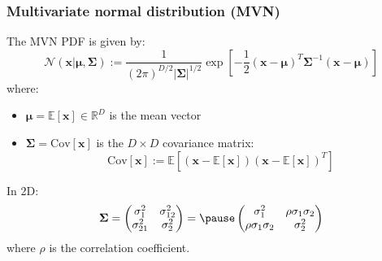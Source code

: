 \documentclass[usenames,dvipsnames,smaller]{beamer}
\newcommand{\lt}{\left}
\newcommand{\rt}{\right}
\newcommand{\?}{\stackrel{?}{=}}
\newcommand{\fr}{\frac}
\begin{document}
 \begin{frame}
   \frametitle{Multivariate normal distribution (MVN)}
   \pause
   The MVN PDF is given by:\pause
   \begin{equation}
     \mathscr{N}(\bm{x} | \bm{\mu}, \bm{\Sigma}) :=
     \fr{1}{(2\pi)^{D/2}|\bm{\Sigma}|^{1/2}} \exp \lt[ -\fr{1}{2} ({\bm x} - {\bm\mu})^T{\bm\Sigma}^{-1}({\bm x} - {\bm \mu})\rt]
     \end{equation}
     \pause
     where:
     \begin{itemize}
     \item $\bm\mu = \mathbb{E}[{\bm x}] \in \mathbb{R}^D$ is the mean vector \pause
     \item $\bm\Sigma = \mathrm{Cov}[{\bm x}]$ is the $D\times D$ covariance matrix: \pause
       \begin{equation}
         \mathrm{Cov}[{\bm x}] := \mathbb{E}\lt[ (\bm x - \mathbb{E}[{\bm x}])(\bm x - \mathbb{E}[{\bm x}])^T\rt]
       \end{equation}
     \end{itemize}
     \pause
     In 2D:
     \pause
     \begin{equation}
       \bm{\Sigma} =
       \begin{pmatrix}
         \sigma_1^2 & \sigma_{12}^2 \\ \sigma_{21}^2 & \sigma_{2}^2
       \end{pmatrix}
       = \pause
       \begin{pmatrix}
         \sigma_1^2 & \rho\sigma_{1}\sigma_2 \\ \rho\sigma_{1}\sigma_2 & \sigma_{2}^2
       \end{pmatrix}
     \end{equation}
     \pause
     where $\rho$ is the correlation coefficient.
 \end{frame}
\end{document}
